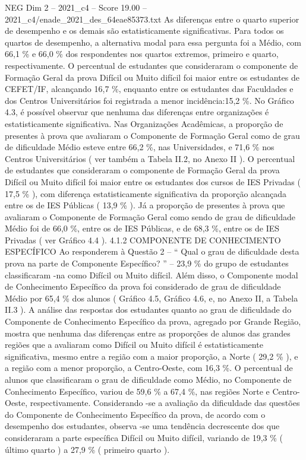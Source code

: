 \begin{textsample}{NEG Dim 2 – 2021\_c4 – Score 19.00 – 2021\_c4/enade\_2021\_des\_64eae85373.txt}
As diferenças entre o quarto superior de desempenho e os demais são estatisticamente significativas.
Para todos os quartos de desempenho, a alternativa modal para essa pergunta foi a Médio, com 66,1 \% e 66,0 \% dos respondentes nos quartos extremos, primeiro e quarto, respectivamente.
O percentual de estudantes que consideraram o componente de Formação Geral da prova Difícil ou Muito difícil foi maior entre os estudantes de CEFET/IF, alcançando 16,7 \%, enquanto entre os estudantes das Faculdades e dos Centros Universitários foi registrada a menor incidência:15,2 \%.
No Gráfico 4.3, é possível observar que nenhuma das diferenças entre organizações é estatisticamente significativa.
Nas Organizações Acadêmicas, a proporção de presentes à prova que avaliaram o Componente de Formação Geral como de grau de dificuldade Médio esteve entre 66,2 \%, nas Universidades, e 71,6 \% nos Centros Universitários ( ver também a Tabela II.2, no Anexo II ).
O percentual de estudantes que consideraram o componente de Formação Geral da prova Difícil ou Muito difícil foi maior entre os estudantes dos cursos de IES Privadas ( 17,5 \% ), com diferença estatisticamente significativa da proporção alcançada entre os de IES Públicas ( 13,9 \% ).
Já a proporção de presentes à prova que avaliaram o Componente de Formação Geral como sendo de grau de dificuldade Médio foi de 66,0 \%, entre os de IES Públicas, e de 68,3 \%, entre os de IES Privadas ( ver Gráfico 4.4 ). 4.1.2 COMPONENTE DE CONHECIMENTO ESPECÍFICO Ao responderem à Questão 2 – “ Qual o grau de dificuldade desta prova na parte de Componente Específico? ” – 23,9 \% do grupo de estudantes classificaram -na como Difícil ou Muito difícil.
Além disso, o Componente modal de Conhecimento Específico da prova foi considerado de grau de dificuldade Médio por 65,4 \% dos alunos ( Gráfico 4.5, Gráfico 4.6, e, no Anexo II, a Tabela II.3 ).
A análise das respostas dos estudantes quanto ao grau de dificuldade do Componente de Conhecimento Específico da prova, agregado por Grande Região, mostra que nenhuma das diferenças entre as proporções de alunos das grandes regiões que a avaliaram como Difícil ou Muito difícil é estatisticamente significativa, mesmo entre a região com a maior proporção, a Norte ( 29,2 \% ), e a região com a menor proporção, a Centro-Oeste, com 16,3 \%.
O percentual de alunos que classificaram o grau de dificuldade como Médio, no Componente de Conhecimento Específico, variou de 59,6 \% a 67,4 \%, nas regiões Norte e Centro-Oeste, respectivamente.
Considerando -se a avaliação da dificuldade das questões do Componente de Conhecimento Específico da prova, de acordo com o desempenho dos estudantes, observa -se uma tendência decrescente dos que consideraram a parte específica Difícil ou Muito difícil, variando de 19,3 \% ( último quarto ) a 27,9 \% ( primeiro quarto ).

\end{textsample}
